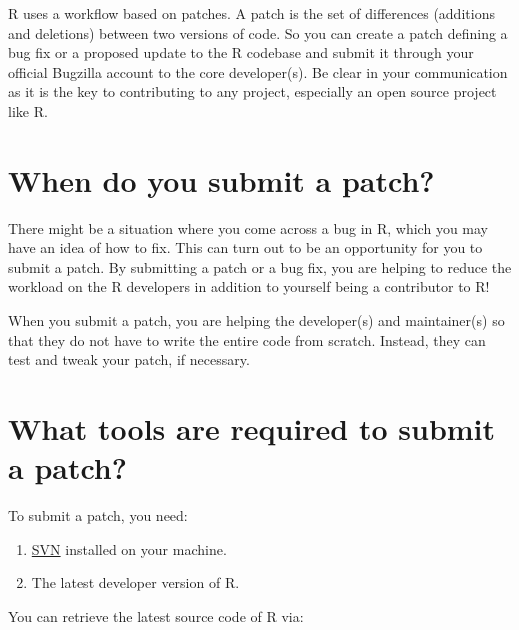 \documentclass[
]{book}
\newenvironment{Shaded}{\begin{snugshade}}{\end{snugshade}}
\newcommand{\BuiltInTok}[1]{#1}
\newcommand{\FunctionTok}[1]{\textcolor[rgb]{0.13,0.29,0.53}{\textbf{#1}}}
\newcommand{\NormalTok}[1]{#1}
\newcommand{\OperatorTok}[1]{\textcolor[rgb]{0.81,0.36,0.00}{\textbf{#1}}}
\newcommand{\StringTok}[1]{\textcolor[rgb]{0.31,0.60,0.02}{#1}}
\newcommand{\VariableTok}[1]{\textcolor[rgb]{0.00,0.00,0.00}{#1}}
\begin{document}
R uses a workflow based on patches. A patch is the set of differences (additions and deletions) between two versions of code. So you can create a patch defining a bug fix or a proposed update to the R codebase and submit it through your official Bugzilla account to the core developer(s). Be clear in your communication as it is the key to contributing to any project, especially an open source project like R.

\section{When do you submit a patch?}\label{when-do-you-submit-a-patch}

There might be a situation where you come across a bug in R, which you may have an idea of how to fix. This can turn out to be an opportunity for you to submit a patch. By submitting a patch or a bug fix, you are helping to reduce the workload on the R developers in addition to yourself being a contributor to R!

When you submit a patch, you are helping the developer(s) and maintainer(s) so that they do not have to write the entire code from scratch. Instead, they can test and tweak your patch, if necessary.

\section{What tools are required to submit a patch?}\label{what-tools-are-required-to-submit-a-patch}

To submit a patch, you need:

\begin{enumerate}
\def\labelenumi{\arabic{enumi}.}
\item
  \href{http://subversion.apache.org/}{SVN} installed on your machine.
\item
  The latest developer version of R.
\end{enumerate}

You can retrieve the latest source code of R via:

\begin{Shaded}
\end{Shaded}
\end{document}
